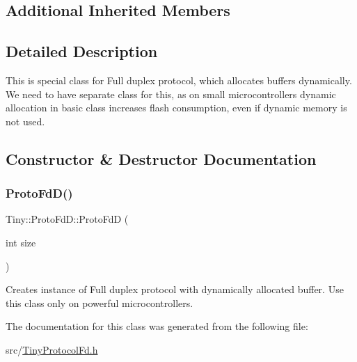 \subsection*{Additional Inherited Members}


\subsection{Detailed Description}
This is special class for Full duplex protocol, which allocates buffers dynamically. We need to have separate class for this, as on small microcontrollers dynamic allocation in basic class increases flash consumption, even if dynamic memory is not used. 

\subsection{Constructor \& Destructor Documentation}
\mbox{\label{classTiny_1_1ProtoFdD_ac6d3b1143cb0776b9ae16e57068f03dc}} 
\subsubsection{\texorpdfstring{Proto\+Fd\+D()}{ProtoFdD()}}
{\footnotesize\ttfamily Tiny\+::\+Proto\+Fd\+D\+::\+Proto\+FdD (\begin{DoxyParamCaption}\item[{int}]{size }\end{DoxyParamCaption})\hspace{0.3cm}{\ttfamily [inline]}}

Creates instance of Full duplex protocol with dynamically allocated buffer. Use this class only on powerful microcontrollers. 

The documentation for this class was generated from the following file\+:\begin{DoxyCompactItemize}
\item 
src/\hyperlink{TinyProtocolFd_8h}{Tiny\+Protocol\+Fd.\+h}\end{DoxyCompactItemize}
